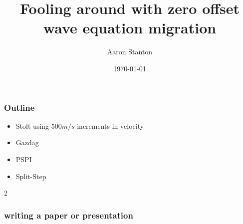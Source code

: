 \title[Short title]{Fooling around with zero offset wave equation migration}
\author{Aaron Stanton}
\date{\today}


\maketitle
{}
\begin{frame} \frametitle{Outline}
    \begin{itemize}
        \item Stolt using 500$m/s$ increments in velocity
        \item Gazdag
        \item PSPI
        \item Split-Step
    \end{itemize}
\end{frame}2

\begin{frame} \frametitle{writing a paper or presentation}
    \pause
\end{frame}

